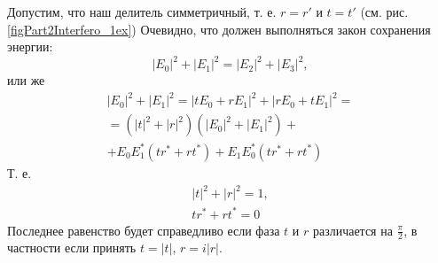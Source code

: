 \begin{example}
  
  
  Допустим, что наш делитель симметричный, т. е. $r=r'$ и $t = t'$
  (см. рис. \ref{figPart2Interfero_1ex})
  Очевидно, что должен выполняться закон сохранения энергии:
  \[
  \left|E_0\right|^2 + \left|E_1\right|^2 =
  \left|E_2\right|^2 + \left|E_3\right|^2, 
  \]
  или же
  \begin{eqnarray}
    \left|E_0\right|^2 + \left|E_1\right|^2 =
    \left|t E_0 + r E_1\right|^2 + \left|r E_0 + t E_1\right|^2 =
    \nonumber \\
    =
    \left(\left|t\right|^2 + \left|r\right|^2\right) 
    \left(\left|E_0\right|^2 + \left|E_1\right|^2\right) +
    \nonumber \\
    + E_0 E_1^\ast \left(t r^\ast + r t^\ast\right)
    + E_1 E_0^\ast \left(t r^\ast + r t^\ast\right)
    \nonumber
  \end{eqnarray}
  Т. е.
  \begin{eqnarray}
    \left|t\right|^2 + \left|r\right|^2 = 1,
    \nonumber \\
    t r^\ast + r t^\ast = 0
    \nonumber
  \end{eqnarray}
  Последнее равенство будет справедливо если фаза $t$ и $r$
  различается на $\frac{\pi}{2}$, в частности если принять
  $t = \left|t\right|$, $r = i \left|r\right|$.
\end{example}



